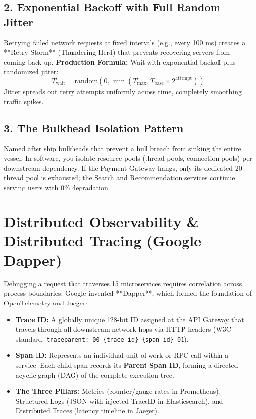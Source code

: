 \documentclass[10pt,journal,compsoc,onecolumn]{IEEEtran}
\begin{document}
\subsection{2. Exponential Backoff with Full Random Jitter}
Retrying failed network requests at fixed intervals (e.g., every 100 ms) creates a **Retry Storm** (Thundering Herd) that prevents recovering servers from coming back up.
\textbf{Production Formula:} Wait with exponential backoff plus randomized jitter:
\begin{equation}
    T_{\text{wait}} = \text{random}(0, \, \min(T_{\text{max}}, \, T_{\text{base}} \times 2^{\text{attempt}}))
\end{equation}
Jitter spreads out retry attempts uniformly across time, completely smoothing traffic spikes.

\subsection{3. The Bulkhead Isolation Pattern}
Named after ship bulkheads that prevent a hull breach from sinking the entire vessel. In software, you isolate resource pools (thread pools, connection pools) per downstream dependency. If the Payment Gateway hangs, only its dedicated 20-thread pool is exhausted; the Search and Recommendation services continue serving users with 0\% degradation.

\section{Distributed Observability \& Distributed Tracing (Google Dapper)}
\label{sec:observability}

Debugging a request that traverses 15 microservices requires correlation across process boundaries. Google invented **Dapper**, which formed the foundation of OpenTelemetry and Jaeger:
\begin{itemize}
    \item \textbf{Trace ID:} A globally unique 128-bit ID assigned at the API Gateway that travels through all downstream network hops via HTTP headers (W3C standard: \texttt{traceparent: 00-\{trace-id\}-\{span-id\}-01}).
    \item \textbf{Span ID:} Represents an individual unit of work or RPC call within a service. Each child span records its \textbf{Parent Span ID}, forming a directed acyclic graph (DAG) of the complete execution tree.
    \item \textbf{The Three Pillars:} Metrics (counter/gauge rates in Prometheus), Structured Logs (JSON with injected TraceID in Elasticsearch), and Distributed Traces (latency timeline in Jaeger).
\end{itemize}
\end{document}
